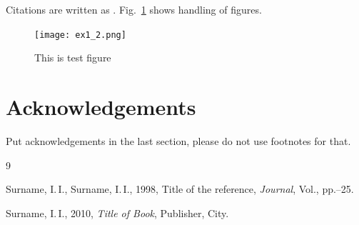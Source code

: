 \documentclass{procDDs}
\begin{document}
 
Citations are written as \cite{paper1}.           %
Fig.~\ref{fig1} shows handling of figures.

\begin{figure}[t!]\centering
	 \texttt{[image: ex1\_2.png]}
  \caption{This is test figure}\label{fig1}
\end{figure}








\section*{Acknowledgements}

Put acknowledgements in the last section, please do not use footnotes for that.


\begin {thebibliography}{9}

 Surname, I.\,I., Surname, I.\,I., 1998,
            Title of the reference,
            \emph{Journal}, Vol., pp.--25.

 Surname, I.\,I., 2010, \textit{Title of Book}, Publisher, City.

\end{thebibliography}
\end{document}
